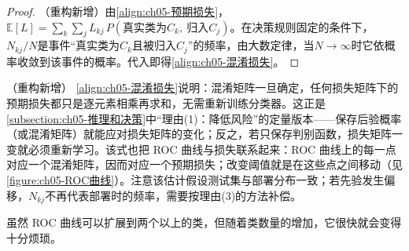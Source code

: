 \documentclass[../../main.tex]{subfiles}
\begin{document}
\begin{proof}
（重构新增）由\eqref{align:ch05-预期损失}，$\mathbb{E}[L]=\sum_{k}\sum_{j}L_{kj}\,P(\text{真实类为}C_k,\ \text{归入}C_j)$。在决策规则固定的条件下，$N_{kj}/N$是事件“真实类为$C_k$且被归入$C_j$”的频率，由大数定律，当$N\to\infty$时它依概率收敛到该事件的概率。代入即得\eqref{align:ch05-混淆损失}。
\end{proof}

\begin{remark}（重构新增）
\eqref{align:ch05-混淆损失}说明：混淆矩阵一旦确定，任何损失矩阵下的预期损失都只是逐元素相乘再求和，无需重新训练分类器。这正是\cref{subsection:ch05-推理和决策}中“理由(1)：降低风险”的定量版本——保存后验概率（或混淆矩阵）就能应对损失矩阵的变化；反之，若只保存判别函数，损失矩阵一变就必须重新学习。该式也把 ROC 曲线与损失联系起来：ROC 曲线上的每一点对应一个混淆矩阵，因而对应一个预期损失；改变阈值就是在这些点之间移动（见\cref{figure:ch05-ROC曲线}）。注意该估计假设测试集与部署分布一致；若先验发生偏移，$N_{kj}$不再代表部署时的频率，需要按理由(3)的方法补偿。
\end{remark}

虽然 ROC 曲线可以扩展到两个以上的类，但随着类数量的增加，它很快就会变得十分烦琐。
\end{document}
